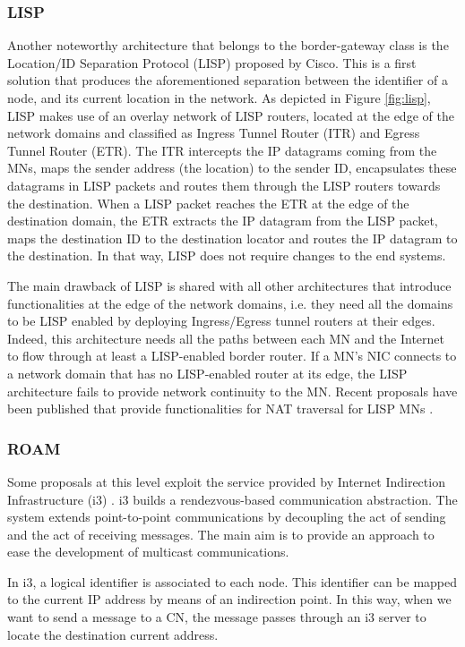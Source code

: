 \documentclass[preprint,12pt]{elsarticle}
\begin{document}
\subsubsection{LISP}
Another noteworthy architecture that belongs to the border-gateway class is the Location/ID Separation Protocol (LISP) 
\cite{lisp} proposed by Cisco. This is 
a first solution that produces the aforementioned separation between the identifier 
of a node, and its current location in the network.
As depicted in Figure \ref{fig:lisp}, LISP makes use of an overlay network of 
LISP routers, located at the edge of the network domains and classified as 
Ingress Tunnel Router (ITR) and Egress Tunnel Router (ETR).
The ITR intercepts the IP datagrams coming from the MNs, maps the sender address 
(the location) to the sender ID, encapsulates these datagrams in LISP packets 
and routes them through the LISP routers towards the destination. 
When a LISP packet reaches the ETR at the edge of the destination domain, the 
ETR extracts the IP datagram from the LISP packet, maps the destination ID to 
the destination locator and routes the IP datagram to the destination. 
In that way, LISP does not require changes to the end systems. 

The main drawback of LISP is shared with all other architectures that introduce functionalities at the edge of the network domains, i.e. they need all the domains to be LISP enabled by deploying Ingress/Egress tunnel routers at their edges. 
Indeed, this architecture needs all the paths between each MN and the Internet to flow through at least a LISP-enabled border router. If a MN’s NIC connects to a network domain that has no LISP-enabled router at its edge, the LISP architecture fails to provide network continuity to the MN.
Recent proposals have been published that provide functionalities for NAT 
traversal for LISP MNs \cite{Klein:2010,ttr}.

\subsubsection{ROAM}
Some proposals at this level exploit the service provided by Internet Indirection
Infrastructure (i3)
\cite{Stoica:2004}. i3 builds a rendezvous-based communication abstraction. The 
system extends point-to-point communications by decoupling the act of sending 
and the act of receiving messages. The main aim is to provide an approach to 
ease the development of multicast communications.

In i3, a logical identifier is associated to each node. This 
identifier can be mapped to the current IP address by means of an indirection 
point. In this way, when we want to send a message to a CN, the message passes through an 
i3 server to locate the destination current address.
\end{document}

